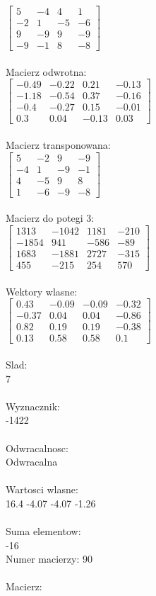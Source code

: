 \documentclass[a4paper,12pt]{article}
\begin{document}
$\begin{bmatrix} 5&-4&4&1\\-2&1&-5&-6\\9&-9&9&-9\\-9&-1&8&-8 \end{bmatrix}$
\\
\\
Macierz odwrotna:\\

$\begin{bmatrix} -0.49&-0.22&0.21&-0.13\\-1.18&-0.54&0.37&-0.16\\-0.4&-0.27&0.15&-0.01\\0.3&0.04&-0.13&0.03 \end{bmatrix}$
\\
\\
Macierz transponowana:\\

$\begin{bmatrix} 5&-2&9&-9\\-4&1&-9&-1\\4&-5&9&8\\1&-6&-9&-8 \end{bmatrix}$
\\
\\
Macierz do potegi 3:\\

$\begin{bmatrix} 1313&-1042&1181&-210\\-1854&941&-586&-89\\1683&-1881&2727&-315\\455&-215&254&570 \end{bmatrix}$
\\
\\
Wektory wlasne:\\

$\begin{bmatrix} 0.43&-0.09&-0.09&-0.32\\-0.37&0.04&0.04&-0.86\\0.82&0.19&0.19&-0.38\\0.13&0.58&0.58&0.1 \end{bmatrix}$
\\
\\
Slad:\\
7
\\
\\
Wyznacznik:\\
-1422
\\
\\
Odwracalnosc:\\
Odwracalna
\\
\\
Wartosci wlasne:\\
16.4 -4.07 -4.07 -1.26
\\
\\
Suma elementow:\\
-16
\\
\newpage
Numer macierzy:
90
\\
\\
Macierz:\\
\end{document}
